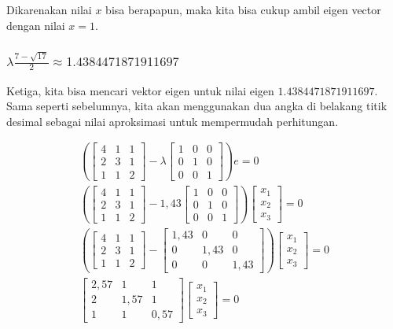 \documentclass{article}
\begin{document}
Dikarenakan nilai $x$ bisa berapapun, maka kita bisa cukup ambil eigen vector dengan nilai $x=1$.

\subsubsection{$\lambda \frac{7-\sqrt{17}}{2} \approx 1.4384471871911697$}
Ketiga, kita bisa mencari vektor eigen untuk nilai eigen $1.4384471871911697$. Sama seperti sebelumnya, kita akan menggunakan dua angka di belakang titik desimal sebagai nilai aproksimasi untuk mempermudah perhitungan.

\begin{align*}
    \left(
\begin{bmatrix}
4 & 1 & 1\\
2 & 3 & 1\\
1 & 1 & 2
\end{bmatrix}
- \lambda
\begin{bmatrix}
1 & 0 & 0\\
0 & 1 & 0\\
0 & 0 & 1
\end{bmatrix}
    \right)
    e = 0\\
        \left(
\begin{bmatrix}
4 & 1 & 1\\
2 & 3 & 1\\
1 & 1 & 2
\end{bmatrix}
- 1,43
\begin{bmatrix}
1 & 0 & 0\\
0 & 1 & 0\\
0 & 0 & 1
\end{bmatrix}
    \right)
    \begin{bmatrix}
        x_1\\x_2\\x_3
    \end{bmatrix} = 0\\
            \left(
\begin{bmatrix}
4 & 1 & 1\\
2 & 3 & 1\\
1 & 1 & 2
\end{bmatrix}
-
\begin{bmatrix}
1,43 & 0 & 0\\
0 & 1,43 & 0\\
0 & 0 & 1,43
\end{bmatrix}
    \right)
    \begin{bmatrix}
        x_1\\x_2\\x_3
    \end{bmatrix} = 0\\
\begin{bmatrix}
2,57 & 1 & 1\\
2 & 1,57 & 1\\
1 & 1 & 0,57
\end{bmatrix}
    \begin{bmatrix}
        x_1\\x_2\\x_3
    \end{bmatrix} = 0
\end{align*}
\end{document}
